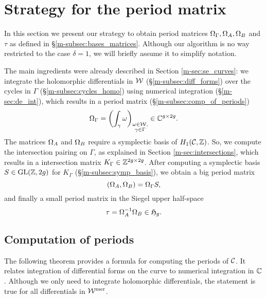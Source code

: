 \documentclass[main.tex]{subfiles}
\begin{document}
  \section{Strategy for the period matrix}\label{sec:strat_pm}

  In this section we present our strategy to obtain period matrices $\Omega_{\Gamma}, \Omega_A, \Omega_B$ and $\tau$ as defined in \S \ref{m-subsec:bases_matrices}. Although our algorithm is no way restricted to the
  case $\delta = 1$, we will briefly assume it to simplify notation.
  
  The main ingredients were already described in
  Section \ref{m-sec:se_curves}: we integrate the holomorphic differentials in $\mathcal{W}$ (\S \ref{m-subsec:diff_forms})
  over the cycles in $\Gamma$ (\S \ref{m-subsec:cycles_homo}) using numerical integration (\S \ref{m-sec:de_int}), which results in a period matrix (\S \ref{m-subsec:comp_of_periods})
  \begin{equation}
      \label{eq:OC}
    \Omega_{\Gamma} = \left( \int_{\gamma} \omega \right)_{\substack{\omega \in \mathcal{W}, \\ \gamma \in \Gamma}} \in \mathbb{C}^{g \times 2g}.
  \end{equation}
  The matrices $\Omega_A$ and $\Omega_B$ require a symplectic basis of $H_1(\mathcal{C},\mathbb{Z})$.
  So, we compute the intersection pairing on $\Gamma$, as explained in Section \ref{m-sec:intersections}, which results in a
  intersection matrix $K_{\Gamma} \in \mathbb{Z}^{2g \times 2g}$.
  After computing a symplectic basis $S \in \operatorname{GL}(\mathbb{Z},2g)$ for $K_{\Gamma}$ (\S \ref{m-subsec:symp_basis}), we obtain a big period matrix
  \begin{equation}
      \label{eq:OAOB}
      (\Omega_A,\Omega_B) = \Omega_{\Gamma} S,
  \end{equation}
   and finally a small period matrix in the Siegel upper half-space
  \begin{equation}
      \label{eq:tau}
   \tau = \Omega_A^{-1} \Omega_B \in \mathfrak{H}_g.
  \end{equation}

  \bigskip

  \subsection{Computation of periods}\label{subsec:comp_of_periods}

  The following theorem provides a formula for computing the periods of $\mathcal{C}$. It relates integration of differential forms on the curve to numerical integration in $\mathbb{C}$.
  Although we only need to integrate holomorphic
  differentials, the statement is true for all differentials in $\mathcal{W}^{\text{mer}}$.
\end{document}
